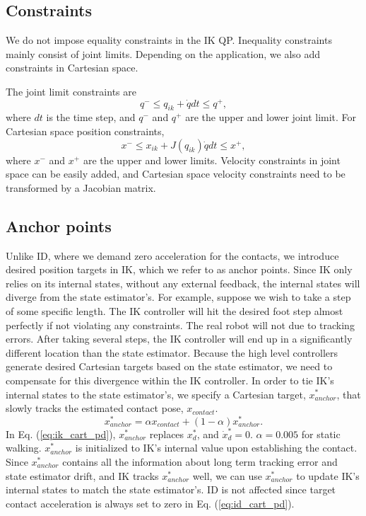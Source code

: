 \documentclass{ws-ijhr}
\newcommand{\eref}[1] {Eq. (\ref{#1})}
\begin{document}
\subsection{Constraints}
We do not impose equality constraints in the IK QP. Inequality constraints 
mainly consist of joint limits. Depending on the application, we also add 
constraints in Cartesian space. 

The joint limit constraints are 
\begin{equation*}
  q^- \leq q_{ik} + \dot{q}dt \leq q^+,
\end{equation*}
where $dt$ is the time step, and $q^-$ and $q^+$ are the upper and lower joint 
limit. 
For Cartesian space position constraints, 
\begin{equation}
  x^- \leq x_{ik} + J(q_{ik})\dot{q}dt \leq x^+,
	\label{eq:ik_cart_ineq}
\end{equation}
where $x^-$ and $x^+$ are the upper and lower limits. 
Velocity constraints in joint space can be easily added, and Cartesian space 
velocity constraints need to be transformed by a Jacobian matrix. 
 
\subsection{Anchor points}
\label{sec:anchor}
Unlike ID, where we demand zero acceleration for the contacts,
we introduce desired position targets in IK, which we refer to as anchor points. 
Since IK only relies on its internal states, without any external feedback, 
the internal states will diverge from the state estimator's.
For example, suppose we wish to take a step of some specific length. 
The IK controller will hit the desired foot step almost perfectly if not 
violating any constraints. The real robot will not due to tracking errors.
After taking several steps, the IK controller will end up in a significantly
different location than the state estimator. 
Because the high level controllers generate desired Cartesian targets 
based on the state estimator, we need to compensate for this 
divergence within the IK controller. 
In order to tie IK's internal states to the state estimator's, we specify a Cartesian
target, $x_{anchor}^*$, that slowly tracks the estimated contact
pose, $x_{contact}$.
\begin{equation}
\label{eq:leaky}
  x_{anchor}^* = \alpha x_{contact} + (1-\alpha)x_{anchor}^*.
\end{equation}
In \eref{eq:ik_cart_pd}, $x_{anchor}^*$ replaces $x^*_d$, and $\dot{x}^*_d = 0$.
$\alpha = 0.005$ for static walking. 
$x_{anchor}^*$ is initialized to IK's internal value upon establishing the contact. 
Since $x_{anchor}^*$ contains all the information about long term tracking error
and state estimator drift, and IK tracks $x_{anchor}^*$ well, we can use 
$x_{anchor}^*$ to update IK's internal states to match the state estimator's. ID is 
not affected since target contact acceleration is always set to zero in \eref{eq:id_cart_pd}.
 
\end{document}
